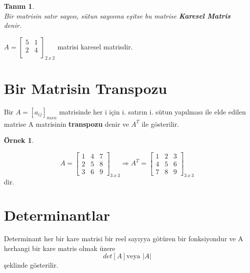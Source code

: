 \documentclass[a4paper,10pt]{book}
\theoremstyle{italik}
\newtheorem{ornek}{Örnek}[chapter]
\newtheorem*{tanim}{Tanım}
\begin{document}
\begin{tanim}
	\quad \\
	Bir matrisin satır sayısı, sütun sayısına eşitse bu matrise \textsl{\textbf{Karesel Matris}} denir.
\end{tanim}
$
A=\left[
\begin{array}{cc}
	5 & 1 \\
	2 & 4 \\
\end{array}
\right]_{2\ x\ 2}
$
matrisi karesel matrisdir.
\section{Bir Matrisin Transpozu}
Bir $ A=\left[a_{ij}\right]_{mxn} $ matrisinde her i için i. satırın i. sütun yapılması ile elde edilen matrise A matrisinin \textbf{transpozu} denir ve $ A^T $ ile gösterilir.
\begin{ornek}
\end{ornek}
$$
A=\left[\begin{array}{cccc}
	1 & 4 & 7 \\
	2 & 5 & 8 \\
	3 & 6 & 9 
\end{array}\right]_{3\ x\ 3}
\Rightarrow
A^{T}=\left[\begin{array}{cccc}
	1 & 2 & 3 \\
	4 & 5 & 6 \\
	7 & 8 & 9 
\end{array}\right]_{3\ x\ 3}
$$
dir.
\section{Determinantlar}
Determinant her bir kare matrisi bir reel sayıyya götüren bir fonksiyondur ve A herhangi bir kare matris olmak üzere
$$
det\left[A\right] \text{veya } |A|
$$ 
şeklinde gösterilir.
\end{document}
